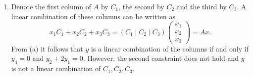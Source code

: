 \documentclass{ximera}
\begin{document}
\begin{exercise}
\begin{solution}
\begin{enumerate}[label=(\alph*)]
\item Denote the first column of $A$ by $C_1$, the second by $C_2$ and the third by $C_3$. A linear combination of these columns can be written as
\[
x_1C_1 + x_2C_2 + x_3C_3 = (C_1\mid C_2\mid C_3)\left(\begin{array}{c} x_1\\x_2\\x_3 \end{array}\right) = Ax. 
\]
From (a) it follows that $y$ is a linear combination of the columns if and only if $y_4 = 0$ and $y_2 + 2y_1 = 0$. However, the second constraint does not hold and $y$ is not a linear combination of $C_1,C_2,C_3$.
\end{enumerate}
\end{solution}
\end{exercise}
\end{document}
